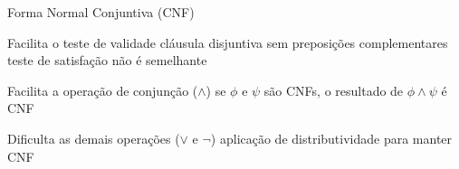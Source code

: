 \expandafter\documentclass\expandafter[table, usenames, svgnames, dvipsnames,14pt, \classopts]{beamer}
\begin{document}
\begin{frame}{Forma Normal Conjuntiva (\uppercase{CNF})}

    \begin{outline}
        \1 Facilita o teste de validade
            \2[-] cláusula disjuntiva sem preposições complementares
            \2[-] teste de satisfação não é semelhante
        
        \vspace{1em}
        
        \1 Facilita a operação de conjunção ($\land$)
            \2[-] se $\phi$ e $\psi$ são CNFs, o resultado de $\phi \land \psi$ é CNF
        
        \vspace{1em}
        
        \1 Dificulta as demais operações ($\lor$ e $\lnot$)
            \2[-] aplicação de distributividade para manter CNF
    \end{outline}

    \begin{center}
    \end{center}
    
\end{frame}
\end{document}
